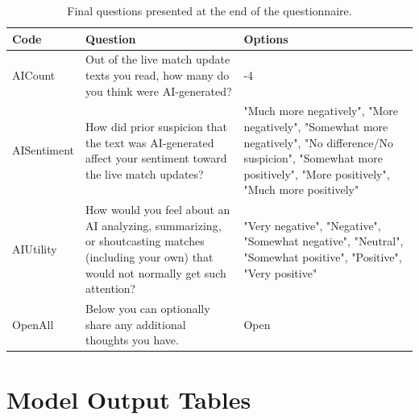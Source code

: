 \renewcommand{\arraystretch}{1.5}
\begin{table}[H]
  \centering\small\sloppy
  \begin{tabularx}{\textwidth}{>{\RaggedRight\arraybackslash}p{2.5cm} >{\RaggedRight\arraybackslash}X >{\RaggedRight\arraybackslash}X}
    \textbf{Code} & \textbf{Question} & \textbf{Options} \\
    \midrule
    AICount & Out of the live match update texts you read, how many do you think were AI-generated? & 0-4 \\
    AISentiment & How did prior suspicion that the text was AI-generated affect your sentiment toward the live match updates? & "Much more negatively", "More negatively", "Somewhat more negatively", "No difference/No suspicion", "Somewhat more positively", "More positively", "Much more positively" \\
    AIUtility & How would you feel about an AI analyzing, summarizing, or shoutcasting matches (including your own) that would not normally get such attention? & "Very negative", "Negative", "Somewhat negative", "Neutral", "Somewhat positive", "Positive", "Very positive" \\
    OpenAll & Below you can optionally share any additional thoughts you have. & Open \\
  \end{tabularx}
  \caption{Final questions presented at the end of the questionnaire.}
  \label{tab:final-questions}
\end{table}

\section{Model Output Tables}

